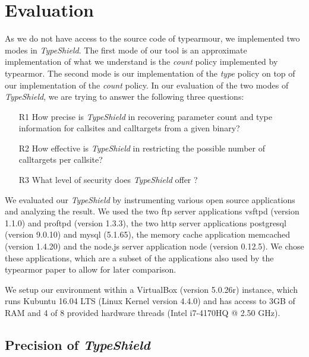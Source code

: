 \chapter{Evaluation}
\label{chapter:Evaluation}
As we do not have access to the source code of typearmour, we implemented two modes in \textit{TypeShield}. The first mode of our tool is an approximate implementation of what we understand is the \textit{count} policy implemented by typearmor. The second mode is our implementation of the \textit{type} policy on top of our implementation of the \textit{count} policy. In our evaluation of the two modes of \textit{TypeShield}, we are trying to answer the following three questions:
\begin{enumerate}

 \item[R1] How precise is \textit{TypeShield} in recovering parameter count and type information for callsites and calltargets from a given binary?

 \item[R2] How effective is \textit{TypeShield} in restricting the possible number of calltargets per callsite?

 \item[R3]  What level of security does \textit{TypeShield} offer ?
%
%

\end{enumerate}
We evaluated our \textit{TypeShield} by instrumenting various open source applications and analyzing the result. We used the two ftp server applications vsftpd (version 1.1.0) and proftpd (version 1.3.3), the two http server applications postgresql (version 9.0.10) and  mysql (5.1.65), the memory cache application memcached (version 1.4.20) and the node.js server application node (version 0.12.5). We chose these applications, which are a subset of the applications also used by the typearmor paper\cite{veen:typearmor} to allow for later comparison.

We setup our environment within a VirtualBox (version 5.0.26r) instance, which runs Kubuntu 16.04 LTS (Linux Kernel version 4.4.0) and has access to 3GB of RAM and 4 of 8 provided hardware threads (Intel i7-4170HQ @ 2.50 GHz).

\section{Precision of \textit{TypeShield}}
\label{section:typeshieldprecision}

